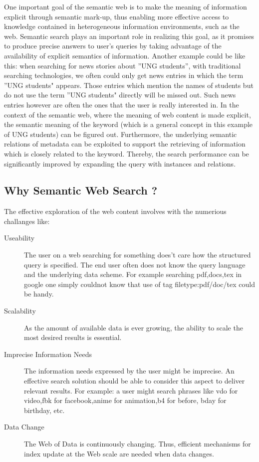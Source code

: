 \documentclass[12pt,a4]{article}
\begin{document}
One important goal of the semantic web is to make the meaning of information explicit through semantic mark-up, thus enabling more effective access to knowledge contained in heterogeneous information environments, such as the web. Semantic search plays an important role in realizing this goal, as it promises to produce precise answers to user’s queries by taking advantage of the availability of explicit semantics of information. Another example could be like this: when searching for news stories about ''UNG students'', with traditional searching technologies, we often could only get news entries in which the term ''UNG students" appears. Those entries which mention the names of students but do not use the term ''UNG students" directly will be missed out. Such news entries however are often the ones that the user is really interested in. In the context of the semantic web, where the meaning of web content is made explicit, the semantic meaning of the keyword (which is a general concept in this example of UNG students) can be figured out. Furthermore, the underlying semantic relations of metadata can be exploited to support the retrieving of information which is closely related to the keyword. Thereby, the search performance can be significantly improved by expanding the query with instances and relations.

\subsection{Why Semantic Web Search ?}
The effective exploration of the web content involves with the numerious challanges like:
\begin{description}
\item[Useability] The user on a web searching for something does't care how the structured query is specified. The end user often does not know the query language and the underlying data scheme. For example searching pdf,docs,tex in google one simply couldnot know that use of tag filetype:pdf/doc/tex could be handy.
\item[Scalability] As the amount of available data is ever growing, the ability to scale the most desired results is essential.
\item[Imprecise Information Needs] The information needs expressed by the user might be imprecise. An effective search solution should be able to consider this aspect to deliver relevant results. For example: a user might search phrases like vdo for video,fbk for facebook,anime for animation,b4 for before, bday for birthday, etc. 
\item[Data Change] The Web of Data is continuously changing. Thus, efficient mechanisms for index update at the Web scale are needed when data changes. 
\end{description}
\end{document}
